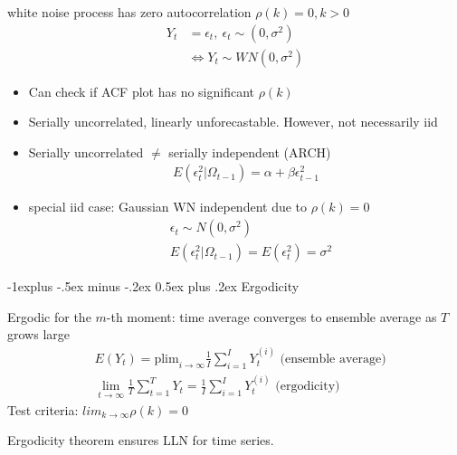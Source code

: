 \documentclass[a4paper,12pt,landscape]{article}
\makeatletter
\renewcommand{\subsection}{\@startsection{subsection}{2}{0mm}%
                                {-1explus -.5ex minus -.2ex}%
                                {0.5ex plus .2ex}%
                                {\normalfont\normalsize\bfseries\color{blue}}}
\makeatother
\begin{document}
\begin{multicols}{3}
white noise process has zero autocorrelation
$ \rho(k) = 0, k > 0 $
\begin{align*}
    Y_t &= \epsilon_t, ~\epsilon_t \sim (0, \sigma^2)\\
        &\Leftrightarrow Y_t \sim WN(0, \sigma^2)
\end{align*}
\begin{itemize}
    \item Can check if ACF plot has no significant
        $\rho(k)$
    \item Serially uncorrelated, linearly unforecastable.
        However, not necessarily iid
    \item Serially uncorrelated $\neq$ serially
        independent (ARCH)
        \begin{align*}
            E(\epsilon_t^2|\Omega_{t-1}) = \alpha + \beta \epsilon_{t-1}^2
        \end{align*}
    \item special iid case: Gaussian WN
        independent due to $\rho(k)=0$
        \begin{align*}
    &\epsilon_t \sim N(0, \sigma^2)\\
    &E(\epsilon_t^2|\Omega_{t-1}) = E(\epsilon_t^2) = \sigma^2
        \end{align*}
\end{itemize}


\subsection{Ergodicity}

Ergodic for the $m$-th moment:
time average converges to ensemble average as $T$ grows large
\begin{align*}
    &E(Y_t) = \text{plim}_{i \rightarrow \infty} \frac{1}{I}\sum_{i=1}^I Y_{t}^{(i)} \text{ (ensemble average)}\\
    &{\lim_{t\rightarrow \infty}}\frac{1}{T}\sum_{t=1}^T Y_t = \frac{1}{I}\sum_{i=1}^I Y_t^{(i)} \text{ (ergodicity)}
\end{align*}
Test criteria: ${lim}_{k\rightarrow \infty}\rho(k)= 0$

Ergodicity theorem ensures LLN for time series.


\end{multicols}
\end{document}
